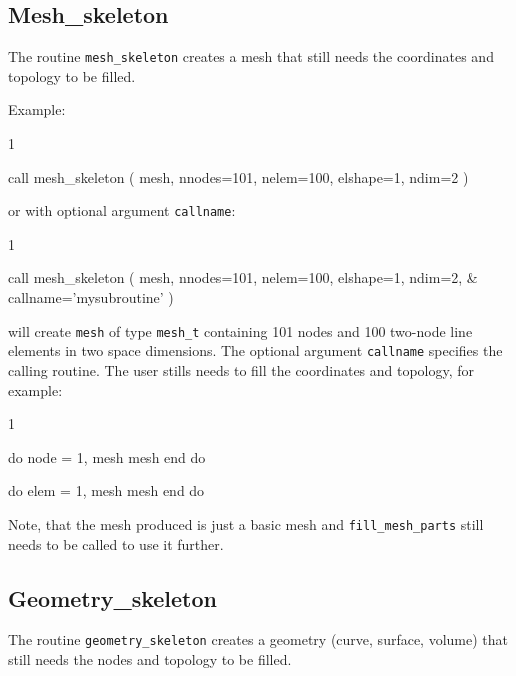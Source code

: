 \subsection{Mesh\_skeleton}
The routine \texttt{mesh\_skeleton} creates a mesh that still needs the coordinates
and topology to be filled.

Example:
\begin{listing}{1}

  call mesh_skeleton ( mesh, nnodes=101, nelem=100, elshape=1, ndim=2 )

\end{listing}
or with optional argument \texttt{callname}:
\begin{listing}{1}

  call mesh_skeleton ( mesh, nnodes=101, nelem=100, elshape=1, ndim=2, &
    callname='mysubroutine' )

\end{listing}
will create \texttt{mesh} of type \texttt{mesh\_t} containing 101 nodes and 100 two-node line elements
in two space dimensions. The optional argument \texttt{callname} specifies the calling routine. 
The user stills needs to fill the coordinates and topology, for example:
\begin{listing}{1}

  do node = 1, mesh%
    mesh%
  end do

  do elem = 1, mesh%
    mesh%
  end do

\end{listing}
Note, that the mesh produced is just a basic mesh and 
\texttt{fill\_mesh\_parts} still needs to be called to use it further.

\subsection{Geometry\_skeleton}
The routine \texttt{geometry\_skeleton} creates a geometry (curve, surface, volume) that still needs the nodes and topology
to be filled.

